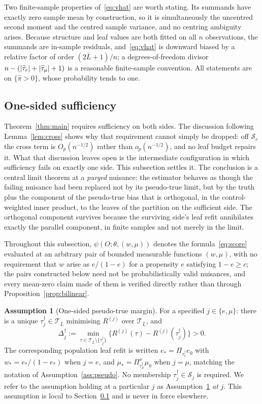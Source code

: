 \documentclass[11pt]{article}
\theoremstyle{plain}
\theoremstyle{definition}
\newtheorem{assumption}{Assumption}
\theoremstyle{remark}
\newcommand{\cT}{\mathcal{T}}
\newcommand{\cS}{\mathcal{S}}
\newcommand{\ez}{e_0}
\newcommand{\mz}{\mu_0}
\newcommand{\that}{\widehat{\tau}}
\newcommand{\pihat}{\widehat{\pi}}
\DeclarePairedDelimiter{\card}{\lvert}{\rvert}
\begin{document}
Two finite-sample properties of~\eqref{eq:vhat} are worth stating. Its summands
have exactly zero sample mean by construction, so it is simultaneously the
uncentred second moment and the centred sample variance, and no centring
ambiguity arises. Because structure and leaf values are both fitted on all $n$
observations, the summands are in-sample residuals, and~\eqref{eq:vhat} is
downward biased by a relative factor of order $(2\bar L+1)/n$; a
degrees-of-freedom divisor $n-(\card{\that_e}+\card{\that_\mu}+1)$ is a
reasonable finite-sample convention. All statements are on $\{\pihat>0\}$, whose
probability tends to one.

\subsection{One-sided sufficiency}\label{sec:onesided}

Theorem~\ref{thm:main} requires sufficiency on both sides. The discussion
following Lemma~\ref{lem:cross} shows why that requirement cannot simply be
dropped: off $\cS_e$ the cross term is $O_p(n^{-1/2})$ rather than
$o_p(n^{-1/2})$, and no leaf budget repairs it. What that discussion leaves open
is the intermediate configuration in which sufficiency fails on exactly one side.
This subsection settles it. The conclusion is a central limit theorem at a
\emph{purged} nuisance: the estimator behaves as though the failing nuisance had
been replaced not by its pseudo-true limit, but by the truth plus the component
of the pseudo-true bias that is orthogonal, in the control-weighted inner
product, to the leaves of the partition on the sufficient side. The orthogonal
component survives because the surviving side's leaf refit annihilates exactly
the parallel component, in finite samples and not merely in the limit.

Throughout this subsection, $\psi(O;\theta,(w,\mu))$ denotes the
formula~\eqref{eq:score} evaluated at an arbitrary pair of bounded measurable
functions $(w,\mu)$, with no requirement that $w$ arise as $e/(1-e)$ for a
propensity $e$ satisfying $1-e\ge c$; the pairs constructed below need not be
probabilistically valid nuisances, and every mean-zero claim made of them is
verified directly rather than through Proposition~\ref{prop:bilinear}.

\begin{assumption}[One-sided pseudo-true margin]\label{ass:pseudo-onesided}
For a specified $j\in\{e,\mu\}$: there is a unique $\tau^\dagger_j\in\cT_{\bar L}$
minimising $R^{(j)}$ over $\cT_{\bar L}$, and
\[
  \Delta^\dagger_j:=\min_{\tau\in\cT_{\bar L}\setminus\{\tau^\dagger_j\}}
  \bigl\{R^{(j)}(\tau)-R^{(j)}(\tau^\dagger_j)\bigr\}>0 .
\]
The corresponding population leaf refit is written $e_*=\Pi_{\tau^\dagger_e}\ez$
with $w_*=e_*/(1-e_*)$ when $j=e$, and $\mu_*=\Pi^\nu_{\tau^\dagger_\mu}\mz$ when
$j=\mu$, matching the notation of Assumption~\ref{ass:pseudo}. No membership
$\tau^\dagger_j\in\cS_j$ is required. We refer to the assumption holding at a
particular $j$ as Assumption~\ref{ass:pseudo-onesided} \emph{at} $j$. This
assumption is local to Section~\ref{sec:onesided} and is never in force
elsewhere.
\end{assumption}
\end{document}
